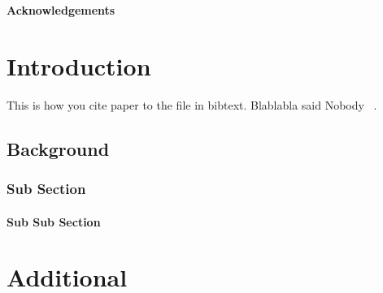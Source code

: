 \documentclass{thesis}
\author{John Doe}                                   %
\date{May 2018}                                     %
\begin{document}
\maketitle
\newpage

% 
% 
\OnehalfSpacing


\begin{abstract}
\blindtext
\end{abstract}

\newpage
\begin{center}
	\textbf{Acknowledgements}
\end{center}

\blindtext

\clearpage


\newpage
\tableofcontents

\newpage
\listoffigures

\newpage
\listoftables



\clearpage



\setcounter{page}{1}

\chapter{Introduction}

\blindtext
This is how you cite paper to the file in bibtext. Blablabla said Nobody ~\cite{Nobody06}.

\section{Background}

\subsection{Sub Section}

\subsubsection{Sub Sub Section}
\blindtext


\appendix

\chapter{Additional}
\blindtext



{}

\end{document}
